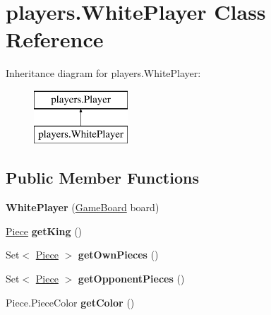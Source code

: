 \hypertarget{classplayers_1_1_white_player}{}\section{players.\+White\+Player Class Reference}
\label{classplayers_1_1_white_player}
Inheritance diagram for players.\+White\+Player\+:\begin{figure}[H]
\begin{center}
\leavevmode
\includegraphics[height=2.000000cm]{classplayers_1_1_white_player}
\end{center}
\end{figure}
\subsection*{Public Member Functions}
\begin{DoxyCompactItemize}
\item 
\mbox{\label{classplayers_1_1_white_player_a548112b0d737ce472587a77dc81fd2a5}} 
{\bfseries White\+Player} (\mbox{\hyperlink{classgameboard_1_1_game_board}{Game\+Board}} board)
\item 
\mbox{\label{classplayers_1_1_white_player_afc74e4fc065579de55c7233fd9b33769}} 
\mbox{\hyperlink{classpieces_1_1_piece}{Piece}} {\bfseries get\+King} ()
\item 
\mbox{\label{classplayers_1_1_white_player_a3dec07e057c5b237cf52afab218fe564}} 
Set$<$ \mbox{\hyperlink{classpieces_1_1_piece}{Piece}} $>$ {\bfseries get\+Own\+Pieces} ()
\item 
\mbox{\label{classplayers_1_1_white_player_aa32d90696bbe466e54ccd60632be1eed}} 
Set$<$ \mbox{\hyperlink{classpieces_1_1_piece}{Piece}} $>$ {\bfseries get\+Opponent\+Pieces} ()
\item 
\mbox{\label{classplayers_1_1_white_player_a15b686a35a48427a7d76fd33439444ee}} 
Piece.\+Piece\+Color {\bfseries get\+Color} ()
\end{DoxyCompactItemize}
